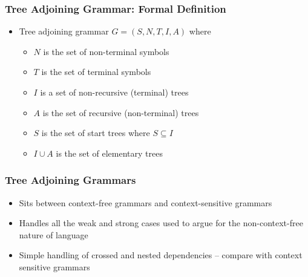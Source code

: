 \documentclass[compress,color=usenames]{beamer}
\begin{document}
\begin{frame}
\frametitle{Tree Adjoining Grammar: Formal Definition}

\begin{itemize}

\item Tree adjoining grammar $G = (S , N, T, I, A)$ where

\begin{itemize}
\item $N$ is the set of non-terminal symbols


\item $T$ is the set of terminal symbols


\item $I$ is a set of non-recursive (terminal) trees


\item $A$ is the set of recursive (non-terminal) trees


\item $S$ is the set of start trees where $S \subseteq I$


\item $I \cup A$ is the set of elementary trees
\end{itemize}

\end{itemize}
\end{frame}

\begin{frame}
\frametitle{Tree Adjoining Grammars}

\begin{itemize}
\item Sits between context-free grammars and context-sensitive grammars

\item Handles all the weak and strong cases used to argue for the
non-context-free nature of language

\item Simple handling of crossed and nested dependencies -- compare with
context sensitive grammars

\end{itemize}
\end{frame}
\end{document}
